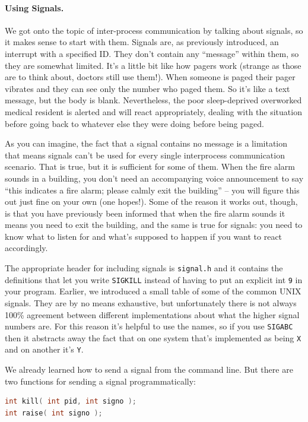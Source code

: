 \paragraph{Using Signals.} We got onto the topic of inter-process communication by talking about signals, so it makes sense to start with them. Signals are, as previously introduced, an interrupt with a specified ID. They don't contain any ``message'' within them, so they are somewhat limited. It's a little bit like how pagers work (strange as those are to think about, doctors still use them!). When someone is paged their pager vibrates and they can see only the number who paged them. So it's like a text message, but the body is blank. Nevertheless, the poor sleep-deprived overworked medical resident is alerted and will react appropriately, dealing with the situation before going back to whatever else they were doing before being paged.

As you can imagine, the fact that a signal contains no message is a limitation that means signals can't be used for every single interprocess communication scenario. That is true, but it is sufficient for some of them. When the fire alarm sounds in a building, you don't need an accompanying voice announcement to say ``this indicates a fire alarm; please calmly exit the building'' -- you will figure this out just fine on your own (one hopes!). Some of the reason it works out, though, is that you have previously been informed that when the fire alarm sounds it means you need to exit the building, and the same is true for signals: you need to know what to listen for and what's supposed to happen if you want to react accordingly.

The appropriate header for including signals is \texttt{signal.h} and it contains the definitions that let you write \texttt{SIGKILL} instead of having to put an explicit int \texttt{9} in your program.  Earlier, we introduced a small table of some of the common UNIX signals. They are by no means exhaustive, but unfortunately there is not always 100\% agreement between different implementations about what the higher signal numbers are. For this reason it's helpful to use the names, so if you use \texttt{SIGABC} then it abstracts away the fact that on one system that's implemented as being \texttt{X} and on another it's \texttt{Y}.

We already learned how to send a signal from the command line. But there are two functions for sending a signal programmatically:

\begin{lstlisting}[language=C]
int kill( int pid, int signo );
int raise( int signo );
\end{lstlisting}


